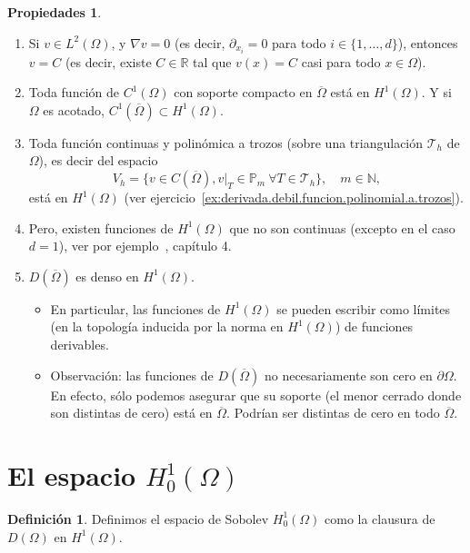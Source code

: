 \documentclass[11pt]{report}
\theoremstyle{plain}
\theoremstyle{definition}
\newtheorem{definition}[theorem]{Definición}
\newtheorem*{properties}{Propiedades}
\newcommand{\R}{\ensuremath{\mathbb{R}}}
\newcommand{\grad}{\ensuremath{\nabla}}
\newcommand{\Th}{\ensuremath{\mathcal{T}_h}\xspace}
\renewcommand{\P}{\ensuremath{\mathbb{P}}}
\begin{document}
\begin{properties}~
\begin{enumerate}
  \item Si $v\in L^2(\Omega)$, y $\grad v=0$ (es decir, $\partial_{x_i}=0$ para todo $i\in\{1,\dots,d\}$), entonces $v=C$ (es decir, existe $C\in\R$ tal que $v(x)=C$ casi para todo $x\in\Omega$).
  \item Toda función de $C^1(\Omega)$ con soporte compacto en $\overline\Omega$ está en $H^1(\Omega)$. Y si $\Omega$ es acotado, $C^1(\overline\Omega)\subset H^1(\Omega)$.
  \item Toda función continuas y polinómica a trozos (sobre una triangulación \Th de $\Omega$), es decir del espacio
    \begin{displaymath}
      V_h=\{v \in C(\overline\Omega), v|_T\in\P_m \ \forall T\in\Th\}, \quad m\in\mathbb N,
    \end{displaymath}
    está en $H^1(\Omega)$ (ver ejercicio~\ref{ex:derivada.debil.funcion.polinomial.a.trozos}).
  \item Pero, existen funciones de $H^1(\Omega)$ que no son continuas (excepto en el caso $d=1$), ver por ejemplo~\cite{allaire2007numerical}, capítulo 4.
  \item  $D(\overline\Omega)$ es denso en $H^1(\Omega)$. 
    \begin{itemize}
      \item En particular, las funciones de $H^1(\Omega)$ se pueden escribir como límites (en la topología inducida por la norma en $H^1(\Omega)$) de funciones derivables.  
      \item Observación: las funciones de $D(\overline\Omega)$ no necesariamente son cero en $\partial\Omega$. En efecto, sólo podemos asegurar que su soporte (el menor cerrado donde son distintas de cero) está en $\overline\Omega$. Podrían ser distintas de cero en todo $\overline\Omega$. 
    \end{itemize}
\end{enumerate}
\end{properties}

\section{El espacio $H_0^1(\Omega)$}
\begin{definition}
 Definimos el espacio de Sobolev $H_0^1(\Omega)$ como la clausura de $D(\Omega)$ en $H^1(\Omega)$. 
\end{definition}
\end{document}
